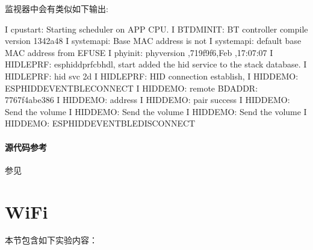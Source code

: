 \documentclass[a4paper,12pt,english]{sphinxmanual}
\begin{document}
{{\sphinxAtStartPar
监视器中会有类似如下输出:

\begin{sphinxVerbatim}[commandchars=\\\{\}]
I  cpu\PYGZus{}start: Starting scheduler on APP CPU.
I  BTDM\PYGZus{}INIT: BT controller compile version \PYG{o}{[}1342a48\PYG{o}{]}
I  system\PYGZus{}api: Base MAC address is not 
I  system\PYGZus{}api:  default base MAC address from EFUSE
I  phy\PYGZus{}init: phy\PYGZus{}version ,719f9f6,Feb  ,17:07:07
I  HID\PYGZus{}LE\PYGZus{}PRF: esp\PYGZus{}hidd\PYGZus{}prf\PYGZus{}cb\PYGZus{}hdl, start added the hid service to the stack database.   
I  HID\PYGZus{}LE\PYGZus{}PRF: hid svc   2d
I  HID\PYGZus{}LE\PYGZus{}PRF: HID connection establish,   
I  HID\PYGZus{}DEMO: ESP\PYGZus{}HIDD\PYGZus{}EVENT\PYGZus{}BLE\PYGZus{}CONNECT
I  HID\PYGZus{}DEMO: remote BD\PYGZus{}ADDR: 7767f4abe386
I  HID\PYGZus{}DEMO: address   
I  HID\PYGZus{}DEMO: pair   success
I  HID\PYGZus{}DEMO: Send the volume
I  HID\PYGZus{}DEMO: Send the volume
I  HID\PYGZus{}DEMO: Send the volume
I  HID\PYGZus{}DEMO: ESP\PYGZus{}HIDD\PYGZus{}EVENT\PYGZus{}BLE\PYGZus{}DISCONNECT
\end{sphinxVerbatim}


\paragraph{源代码参考}
\label{\detokenize{exp-esp32/bluetooth/hid-device-gatt:id8}}
\sphinxAtStartPar
参见{\hyperref[\detokenize{reference::doc}]{}}

\sphinxstepscope


\section{WiFi}
\label{\detokenize{exp-esp32/wifi/index:wifi}}\label{\detokenize{exp-esp32/wifi/index::doc}}
\sphinxAtStartPar
本节包含如下实验内容：

}}
\end{document}
